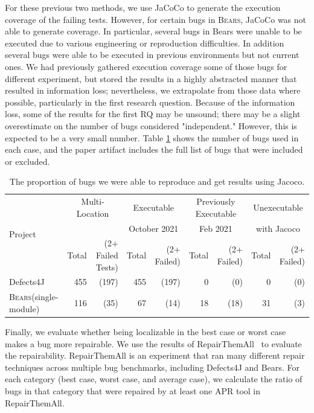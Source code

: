 \documentclass[10pt,journal,compsoc]{IEEEtran}
\newcommand\bears{\textsc{Bears}\xspace}
\begin{document}
For these previous two methods, we use JaCoCo to generate the execution coverage of the failing tests. 
However, for certain bugs in \bears{}, JaCoCo was not able to generate coverage. 
In particular, several bugs in Bears were unable to be executed due to various engineering or reproduction difficulties.
In addition several bugs were able to be executed 
in previous environments but not current ones. 
We had previously gathered execution coverage some of those bugs for different experiment, but stored the results in
a highly abstracted manner that resulted in information loss; nevertheless, we extrapolate from those data where possible, particularly in
the first research question.
Because of the information loss, some of the results for the first RQ may be unsound; 
there may be a slight overestimate on the number of bugs considered "independent."
However, this is expected to be a very small number.
Table \ref{tab:runnable_jacoco} shows the number of bugs used in each case, and the paper artifact includes the full list of bugs that were included or excluded.

\begin{table}
\begin{center}
\begin{tabular}{l | rr | rr | rr | rr }
\toprule
\multirow{3}{*}{Project}  
& \multicolumn{2}{c}{Multi-Location}      
& \multicolumn{2}{c}{Executable} 
& \multicolumn{2}{c}{Previously Executable}
& \multicolumn{2}{c}{Unexecutable} \\
& \multicolumn{2}{c}{}   
& \multicolumn{2}{c}{October 2021}             
& \multicolumn{2}{c}{Feb 2021}  
& \multicolumn{2}{c}{with Jacoco}
\\
\cmidrule{2-9}
& Total
& (2+ Failed Tests)
& Total
& (2+ Failed)
& Total
& (2+ Failed)
& Total
& (2+ Failed)
\\
\midrule
Defects4J & 455 & (197) & 455 & (197) & 0 & (0) & 0 & (0) \\
\midrule
\bears (single-module) & 116 & (35) &  67 & (14) & 18 & (18) & 31 & (3)\\
\bottomrule
\end{tabular}
\end{center}
\caption{\label{tab:runnable_jacoco} \small The proportion of bugs we were able to reproduce and get results using Jacoco. }
\end{table}

Finally, we evaluate whether being localizable in the best case or worst case makes a bug more repairable. 
We use the results of RepairThemAll~\cite{durieux-repair-them-all} to evaluate the repairability. 
RepairThemAll is an experiment that ran many different repair techniques across multiple bug benchmarks, including Defects4J and Bears.
For each category (best case, worst case, and average case), we calculate the ratio of bugs in that category that were repaired by at least one APR tool in RepairThemAll. 
\end{document}
